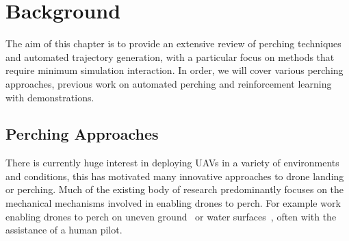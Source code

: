 \chapter{Background}


The aim of this chapter is to provide an extensive review of perching techniques and automated trajectory generation, with a particular focus on methods that require minimum simulation interaction.
In order, we will cover various perching approaches, previous work on automated perching and reinforcement learning with demonstrations.

\section{Perching Approaches}


There is currently huge interest in deploying UAVs in a variety of environments and conditions, this has motivated many innovative approaches to drone landing or perching.
Much of the existing body of research predominantly focuses on the mechanical mechanisms involved in enabling drones to perch.
For example work enabling drones to perch on uneven ground~\cite{perching-uneven-ground} or water surfaces~\cite{perching-water1,perching-water2}, often with the assistance of a human pilot.

